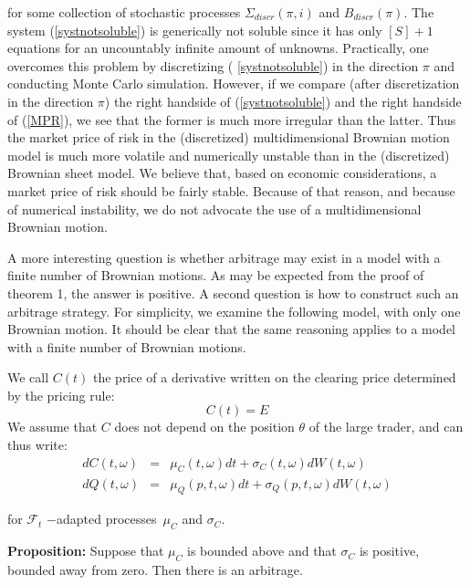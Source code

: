 \documentclass{article}
\begin{document}
for some collection of stochastic processes $\Sigma _{discr}(\pi ,i)$ and $%
B_{discr}(\pi )$. The system (\ref{systnotsoluble}) is generically not
soluble since it has only $[S]+1$ equations for an uncountably infinite
amount of unknowns. Practically, one overcomes this problem by discretizing (%
\ref{systnotsoluble}) in the direction $\pi $ and conducting Monte Carlo
simulation. However, if we compare (after discretization in the direction $%
\pi $) the right handside of (\ref{systnotsoluble}) and the right handside
of (\ref{MPR}), we see that the former is much more irregular than the
latter. Thus the market price of risk in the (discretized) multidimensional
Brownian motion model is much more volatile and numerically unstable than in
the (discretized) Brownian sheet model. We believe that, based on economic
considerations, a market price of risk should be fairly stable. Because of
that reason, and because of numerical instability, we do not advocate the
use of a multidimensional Brownian motion.

\bigskip

A more interesting question is whether arbitrage may exist in a model with a
finite number of Brownian motions. As may be expected from the proof of
theorem 1, the answer is positive. A second question is how to construct
such an arbitrage strategy. For simplicity, we examine the following model,
with only one Brownian motion. It should be clear that the same reasoning
applies to a model with a finite number of Brownian motions.

\bigskip

We call $C(t)$ the price of a derivative written on the clearing price
determined by the pricing rule:%
\begin{equation*}
C(t)=E
\end{equation*}
We assume that $C$ does not depend on the position $\theta $ of the large
trader, and can thus write:%
\begin{eqnarray*}
dC(t,\omega ) &=&\mu _{C}(t,\omega )dt+\sigma _{C}(t,\omega )dW(t,\omega ) \\
dQ(t,\omega ) &=&\mu _{Q}(p,t,\omega )dt+\sigma _{Q}(p,t,\omega )dW(t,\omega
)
\end{eqnarray*}%
\bigskip

for $\mathcal{F}_{t}$ $-$adapted processes\ $\mu _{C}$ and $\sigma _{C}$.

\bigskip 

\textbf{Proposition:} Suppose that $\mu _{C}$ is bounded above and that $%
\sigma _{C}$ is positive, bounded away from zero. Then there is an arbitrage.
\end{document}
